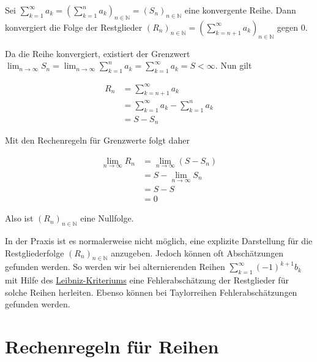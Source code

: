 \documentclass[fontsize=9pt,
               parskip=half-,
               DIV=14,
               listof=chapterentry,
               tocflat]{scrbook}
\begin{document}
\begin{theorem*}
Sei $\sum _{k=1}^{\infty }a_{k}=\left(\sum _{k=1}^{n}a_{k}\right)_{n\in \mathbb {N} }=(S_{n})_{n\in \mathbb {N} }$ eine konvergente Reihe. Dann konvergiert die Folge der Restglieder $(R_{n})_{n\in \mathbb {N} }=\left(\sum _{k=n+1}^{\infty }a_{k}\right)_{n\in \mathbb {N} }$ gegen $0$.

\end{theorem*}

\begin{proof*}
Da die Reihe konvergiert, existiert der Grenzwert $\lim _{n\to \infty }S_{n}=\lim _{n\to \infty }\sum _{k=1}^{n}a_{k}=\sum _{k=1}^{\infty }a_{k}=S<\infty $. Nun gilt

\begin{align*}
R_{n}&=\sum _{k=n+1}^{\infty }a_{k}\\&=\sum _{k=1}^{\infty }a_{k}-\sum _{k=1}^{n}a_{k}\\&=S-S_{n}
\end{align*}

Mit den Rechenregeln für Grenzwerte folgt daher

\begin{align*}
\lim _{n\to \infty }R_{n}&=\lim _{n\to \infty }(S-S_{n})\\&=S-\lim _{n\to \infty }S_{n}\\&=S-S\\&=0
\end{align*}

Also ist $(R_{n})_{n\in \mathbb {N} }$ eine Nullfolge.

\end{proof*}

\begin{hint*}
In der Praxis ist es normalerweise nicht möglich, eine explizite Darstellung für die Restgliederfolge $(R_{n})_{n\in \mathbb {N} }$ anzugeben. Jedoch können oft Abschätzungen gefunden werden. So werden wir bei alternierenden Reihen $\sum _{k=1}^{\infty }(-1)^{k+1}b_{k}$ mit Hilfe des \href{https://de.wikibooks.org/wiki/Mathe\_für\_Nicht-Freaks:\_Leibniz-Kriterium}
{Leibniz-Kriteriums} eine Fehlerabschätzung der Restglieder für solche Reihen herleiten. Ebenso können bei Taylorreihen Fehlerabschätzungen gefunden werden.

\end{hint*}



\chapter{Rechenregeln für Reihen}
\end{document}
